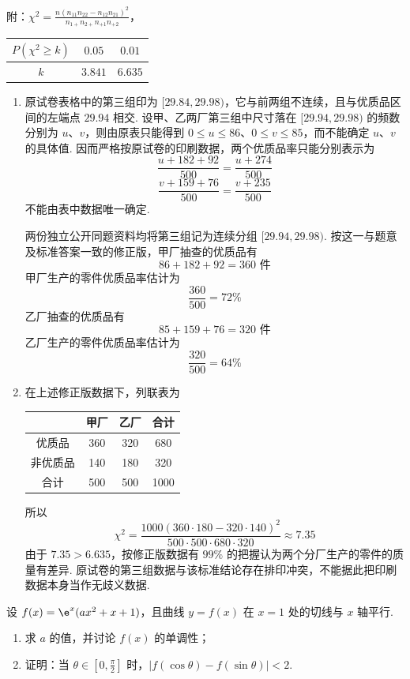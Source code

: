 \begin{problem}
附：\(\chi^2 = \frac{n(n_{11}n_{22} - n_{12}n_{21})^2}{n_{1+}n_{2+}n_{+1}n_{+2}}\)，
\begin{center}
\begin{tabular}{c|cc}
\(P(\chi^2 \geqslant k)\) & \(0.05\) & \(0.01\) \\
\hline
\(k\) & \(3.841\) & \(6.635\)
\end{tabular}
\end{center}
\end{problem}

\begin{solution}
\begin{enumerate}
\item 原试卷表格中的第三组印为 \([29.84,29.98)\)，它与前两组不连续，且与优质品区间的左端点 \(29.94\) 相交. 设甲、乙两厂第三组中尺寸落在 \([29.94,29.98)\) 的频数分别为 \(u\)、\(v\)，则由原表只能得到 \(0\leqslant u\leqslant86\)、\(0\leqslant v\leqslant85\)，而不能确定 \(u\)、\(v\) 的具体值. 因而严格按原试卷的印刷数据，两个优质品率只能分别表示为
\[
\frac{u+182+92}{500}=\frac{u+274}{500}
\]
\[
\frac{v+159+76}{500}=\frac{v+235}{500}
\]
不能由表中数据唯一确定.

两份独立公开同题资料均将第三组记为连续分组 \([29.94,29.98)\). 按这一与题意及标准答案一致的修正版，甲厂抽查的优质品有
\[
86+182+92=360\text{ 件}
\]
甲厂生产的零件优质品率估计为
\[
\frac{360}{500}=72\%
\]
乙厂抽查的优质品有
\[
85+159+76=320\text{ 件}
\]
乙厂生产的零件优质品率估计为
\[
\frac{320}{500}=64\%
\]
\item 在上述修正版数据下，列联表为
\begin{center}
\begin{tabular}{|c|c|c|c|}
\hline
 & 甲厂 & 乙厂 & 合计 \\
\hline
优质品 & 360 & 320 & 680 \\
\hline
非优质品 & 140 & 180 & 320 \\
\hline
合计 & 500 & 500 & 1000 \\
\hline
\end{tabular}
\end{center}
所以
\[
\chi^{2}=\frac{1000(360\cdot180-320\cdot140)^{2}}{500\cdot500\cdot680\cdot320}
\approx7.35
\]
由于 \(7.35>6.635\)，按修正版数据有 \(99\%\) 的把握认为两个分厂生产的零件的质量有差异. 原试卷的第三组数据与该标准结论存在排印冲突，不能据此把印刷数据本身当作无歧义数据.
\end{enumerate}
\end{solution}

\begin{problem}
设 \( f(x) = \e^{x}(ax^{2} + x + 1) \)，且曲线 \( y = f(x) \) 在 \( x = 1 \) 处的切线与 \( x \) 轴平行.
\begin{enumerate}
\item 求 \(a\) 的值，并讨论 \( f(x) \) 的单调性；
\item 证明：当 \(\theta \in \left[0, \frac{\pi}{2}\right]\) 时，\(|f(\cos \theta) - f(\sin \theta)| < 2\).
\end{enumerate}
\end{problem}

